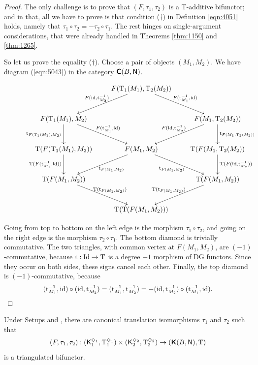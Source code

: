 \begin{proof}
The only challenge is to prove that $(F, \tau_1, \tau_2)$ is a T-additive 
bifunctor; and in that, all we have to prove is that condition 
($\dag$) in Definition \ref{eqn:4051} holds, namely that 
$\tau_1 \circ \tau_2 = - \tau_2 \circ \tau_1$.
The rest hinges on single-argument considerations, that were already handled in 
Theorems \ref{thm:1150} and \ref{thm:1265}. 

So let us prove the equality ($\dag$). Choose a pair of objects 
$(M_1, M_2)$. We have diagram (\ref{eqn:5043}) in the category 
$\boldsymbol{\mathsf{C}}(B, \operatorname{\mathsf{N}})$. 
\begin{figure}
\begin{equation} \label{eqn:5043}
\UseTips  \xymatrix @C=5ex @R=6.5ex {
&
F(\opn{T}_1(M_1), \opn{T}_2(M_2))
\ar[dr]^{F(\opn{t}_{M_1}^{-1}, \opn{id})}
\ar[dl]_{F(\opn{id}, \opn{t}_{M_2}^{-1})}
\\
F(\opn{T}_1(M_1), M_2)
\ar[d]_{\opn{t}_{F(\opn{T}_1(M_1), M_2)}}
\ar[dr]^{F(\opn{t}_{M_1}^{-1}, \opn{id})}
&
&
F(M_1, \opn{T}_2(M_2))
\ar[d]^{\opn{t}_{F(M_1, \opn{T}_2(M_2))}}
\ar[dl]_{F(\opn{id}, \opn{t}_{M_2}^{-1})}
\\
\opn{T}(F(\opn{T}_1(M_1), M_2))
\ar[d]_{\opn{T}(F(\opn{t}_{M_1}^{-1}, \opn{id}))}
&
F(M_1, M_2)
\ar[dl]^{\ \ \opn{t}_{F(M_1, M_2)}}
\ar[dr]_{\opn{t}_{F(M_1, M_2)}\ }
&
\opn{T}(F(M_1, \opn{T}_2(M_2))
\ar[d]^{\opn{T}(F(\opn{id}, \opn{t}_{M_2}^{-1}))}
\\
\opn{T}(F(M_1, M_2))
\ar[dr]^{\opn{T}(\opn{t}_{F(M_1, M_2)})}
&
&
\opn{T}(F(M_1, M_2))
\ar[dl]_{\opn{T}(\opn{t}_{F(M_1, M_2)}) \ \ }
\\
&
\opn{T}(\opn{T}(F(M_1, M_2)))
} 
\end{equation}
\end{figure}
Going from top to bottom on the left edge is the 
morphism $\tau_1 \circ \tau_2$, and going on the right edge is the 
morphism $\tau_2 \circ \tau_1$.
The bottom diamond is trivially commutative. 
The two triangles, with common vertex at $F(M_1, M_2)$, are $(-1)$-commutative, 
because $\operatorname{t} : \operatorname{Id} \to \operatorname{T}$ is a degree $-1$ morphism of DG 
functors. Since they occur on both sides, these signs cancel each other. 
Finally, the top diamond is $(-1)$-commutative, because
\[ (\operatorname{t}_{M_1}^{-1}, \operatorname{id}) \circ (\operatorname{id}, \operatorname{t}_{M_2}^{-1}) = 
(\operatorname{t}_{M_1}^{-1}, \operatorname{t}_{M_2}^{-1}) = 
- (\operatorname{id}, \operatorname{t}_{M_2}^{-1}) \circ (\operatorname{t}_{M_1}^{-1}, \operatorname{id}) . 
\qedhere \]
\end{proof}

\begin{thm} \label{thm:4225} 
Under Setups \tup{\ref{set:3231}} and \tup{\ref{set:3230}},
there are canonical translation isomorphisms $\tau_1$ and $\tau_2$ such that 
\[ (F, \tau_1, \tau_2) : 
(\operatorname{\mathsf{K}}_1^{\diamondsuit_1}, \operatorname{T}_1^{\diamondsuit_1}) \times 
(\operatorname{\mathsf{K}}_2^{\diamondsuit_2}, \operatorname{T}_2^{\diamondsuit_2})
\to (\boldsymbol{\mathsf{K}}(B, \operatorname{\mathsf{N}}), \operatorname{T})  \]
is a triangulated bifunctor. 
\end{thm}

